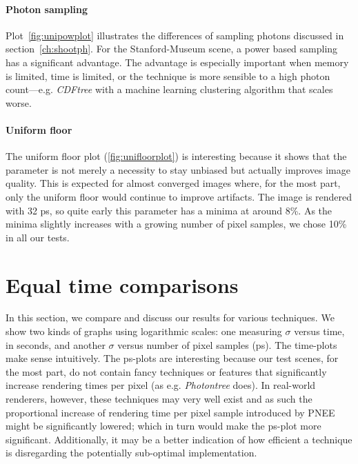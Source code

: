 \paragraph{Photon sampling}
\label{ch:ev:photonsampling}

Plot~\ref{fig:unipowplot} illustrates the differences of sampling photons discussed in section~\ref{ch:shootph}. For the Stanford-Museum scene, a power based sampling has a significant advantage. The advantage is especially important when memory is limited, time is limited, or the technique is more sensible to a high photon count---e.g. \textit{CDFtree} with a machine learning clustering algorithm that scales worse.  

\paragraph{Uniform floor}
\label{ch:ev:uniformfloor}
The uniform floor plot (\ref{fig:unifloorplot}) is interesting because it shows that the parameter is not merely a necessity to stay unbiased but actually improves image quality. This is expected for almost converged images where, for the most part, only the uniform floor would continue to improve artifacts. The image is rendered with 32 ps, so quite early this parameter has a minima at around 8\%. As the minima slightly increases with a growing number of pixel samples, we chose 10\% in all our tests.




\section{Equal time comparisons}
\label{sec:etc}
In this section, we compare and discuss our results for various techniques. We show two kinds of graphs using logarithmic scales: one measuring $\sigma$ versus time, in seconds, and another $\sigma$ versus number of pixel samples (ps). The time-plots make sense intuitively. The ps-plots are interesting because our test scenes, for the most part, do not contain fancy techniques or features that significantly increase rendering times per pixel (as e.g. \textit{Photontree} does). In real-world renderers, however, these techniques may very well exist and as such the proportional increase of rendering time per pixel sample introduced by PNEE might be significantly lowered; which in turn would make the ps-plot more significant. Additionally, it may be a better indication of how efficient a technique is disregarding the potentially sub-optimal implementation.

